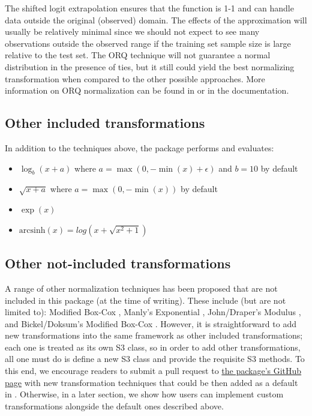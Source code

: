 The shifted logit extrapolation ensures that the function is 1-1 and can
handle data outside the original (observed) domain. The effects of the
approximation will usually be relatively minimal since we should not
expect to see many observations outside the observed range if the
training set sample size is large relative to the test set. The ORQ
technique will not guarantee a normal distribution in the presence of
ties, but it still could yield the best normalizing transformation when
compared to the other possible approaches. More information on ORQ
normalization can be found in \citet{orq_paper} or in the
 documentation.

\hypertarget{other-included-transformations}{%
\subsection{Other included
transformations}\label{other-included-transformations}}

In addition to the techniques above, the  package
performs and evaluates:

\begin{itemize}
\tightlist
\item
  \(\log_b(x + a)\) where \(a = \max(0, -\min(x) + \epsilon)\) and
  \(b = 10\) by default
\item
  \(\sqrt{x + a}\) where \(a = \max(0, -\min(x))\) by default
\item
  \(\exp(x)\)
\item
  \(\text {arcsinh}(x) = log(x + \sqrt{x^2 + 1})\)
\end{itemize}

\hypertarget{other-not-included-transformations}{%
\subsection{Other not-included
transformations}\label{other-not-included-transformations}}

A range of other normalization techniques has been proposed that are not
included in this package (at the time of writing). These include (but
are not limited to): Modified Box-Cox \citep{BoxCox1964}, Manly's
Exponential \citep{Manly}, John/Draper's Modulus \citep{JohnDraper}, and
Bickel/Doksum's Modified Box-Cox \citep{BickelDoksum}. However, it is
straightforward to add new transformations into the same framework as
other included transformations; each one is treated as its own S3 class,
so in order to add other transformations, all one must do is define a
new S3 class and provide the requisite S3 methods. To this end, we
encourage readers to submit a pull request to
\href{https://github.com/petersonR/bestNormalize}{the package's GitHub
page} with new transformation techniques that could be then added as a
default in . Otherwise, in a later section, we show
how users can implement custom transformations alongside the default
ones described above.

